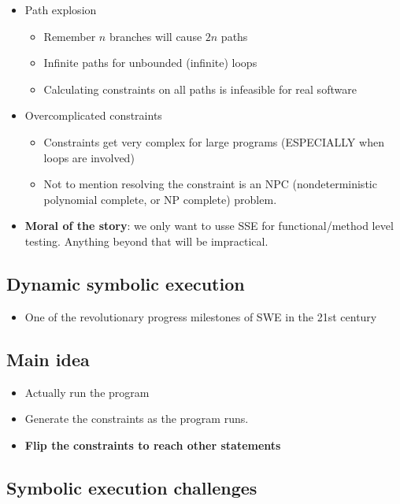 \documentclass[12pt]{book}
\begin{document}
\begin{itemize}
    \item Path explosion
    \begin{itemize}
        \item Remember $n$ branches will cause $2n$ paths
        \item Infinite paths for unbounded (infinite) loops
        \item Calculating constraints on all paths is infeasible for real software
    \end{itemize} 

    \item Overcomplicated constraints
    \begin{itemize}
        \item Constraints get very complex for large programs (ESPECIALLY when loops are involved)
        \item Not to mention resolving the constraint is an NPC (nondeterministic polynomial complete, or NP complete) problem.
    \end{itemize}

    \item \textbf{Moral of the story}: we only want to usse SSE for functional/method level testing. Anything beyond that will be impractical.
\end{itemize}

\subsection{Dynamic symbolic execution}
\begin{itemize}
    \item One of the revolutionary progress milestones of SWE in the 21st century
\end{itemize}

\subsection{Main idea}
\begin{itemize}
    \item Actually run the program
    \item Generate the constraints as the program runs.
    \item \textbf{Flip the constraints to reach other statements}
\end{itemize} 

\subsection{Symbolic execution challenges}
\end{document}
